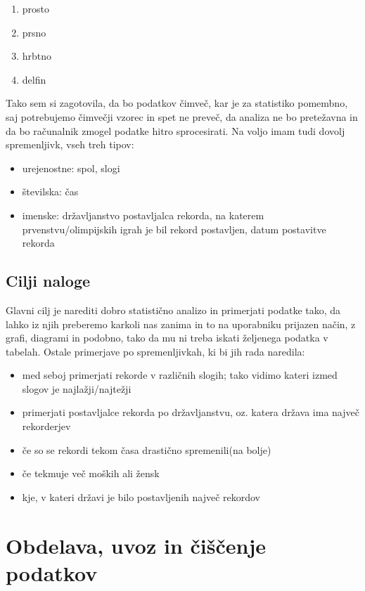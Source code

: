 \documentclass[11pt,a4paper]{article}
\begin{document}
\begin{enumerate}
\item prosto
\item prsno
\item hrbtno
\item delfin
\end{enumerate}

Tako sem si zagotovila, da bo podatkov čimveč, kar je za statistiko pomembno, saj potrebujemo čimvečji vzorec in spet ne preveč, da analiza ne bo pretežavna in da bo računalnik zmogel podatke hitro sprocesirati. Na voljo imam tudi dovolj spremenljivk, vseh treh tipov:

\begin{itemize}
\item urejenostne: spol, slogi
\item številska: čas
\item imenske: državljanstvo postavljalca rekorda, na katerem prvenstvu/olimpijskih igrah je bil rekord postavljen, datum postavitve rekorda
\end{itemize}

\subsection{Cilji naloge}


Glavni cilj je narediti dobro statistično analizo in primerjati podatke tako, da lahko iz njih preberemo karkoli nas zanima in to na uporabniku prijazen način, z grafi, diagrami in podobno, tako da mu ni treba iskati željenega podatka v tabelah. Ostale primerjave po spremenljivkah, ki bi jih rada naredila:

\begin{itemize}
\item med seboj primerjati rekorde v različnih slogih; tako vidimo kateri izmed slogov je najlažji/najtežji
\item primerjati postavljalce rekorda po državljanstvu, oz. katera država ima največ rekorderjev
\item če so se rekordi tekom časa drastično spremenili(na bolje)
\item če tekmuje več moških ali žensk
\item kje, v kateri državi je bilo postavljenih največ rekordov
\end{itemize}


\section{Obdelava, uvoz in čiščenje podatkov}
\end{document}
